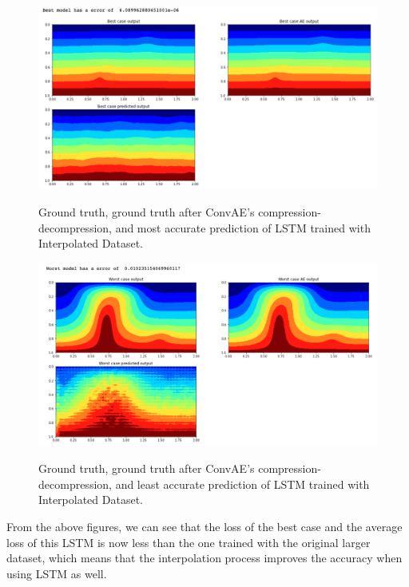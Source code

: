 \begin{figure}[H]
    \caption{Ground truth, ground truth after ConvAE's compression-decompression, and most accurate prediction of LSTM trained with Interpolated Dataset.}
    \includegraphics[scale=0.5]{figures/mantle_convection_images/larger_dataset_interpolated/LSTM_Best.png}
    \label{figure:LSTM_interpolated_best}
\end{figure}

\begin{figure}[H]
    \caption{Ground truth, ground truth after ConvAE's compression-decompression, and least accurate prediction of LSTM trained with Interpolated Dataset.}
    \includegraphics[scale=0.5]{figures/mantle_convection_images/larger_dataset_interpolated/LSTM_Worst.png}
    \label{figure:LSTM_interpolated_worst}
\end{figure}

From the above figures, we can see that the loss of the best case and the average loss of this LSTM is now less than the one trained with the original larger dataset, which means that the interpolation process improves the accuracy when using LSTM as well.

